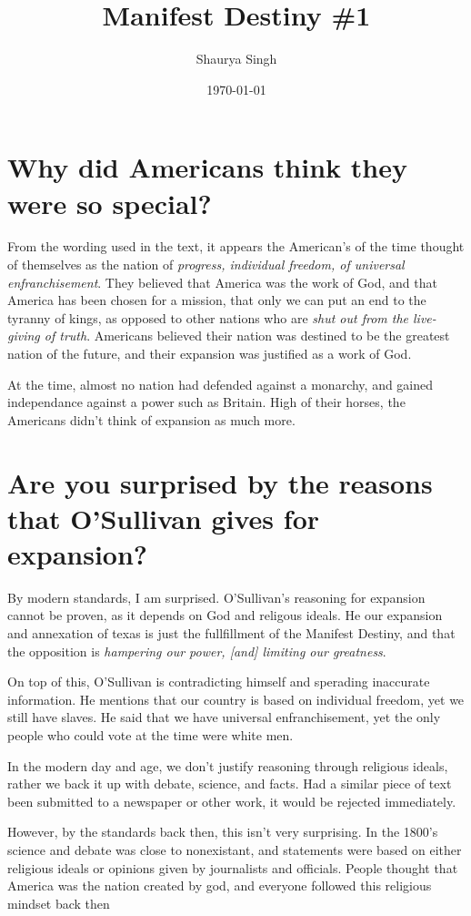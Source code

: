 \documentclass{scrartcl}
\author{Shaurya Singh}
\date{\today}
\title{Manifest Destiny \#1}
\begin{document}
\maketitle

\section{Why did Americans think they were so special?}
\label{sec:org399c913}
From the wording used in the text, it appears the American's of the time thought
of themselves as the nation of \emph{progress, individual freedom, of universal enfranchisement}. They believed that America was the work of God, and that
America has been chosen for a mission, that only we can put an end to the
tyranny of kings, as opposed to other nations who are \emph{shut out from the live-giving of truth}. Americans believed their nation was destined to be the
greatest nation of the future, and their expansion was justified as a work of
God.

At the time, almost no nation had defended against a monarchy, and gained
independance against a power such as Britain. High of their horses, the
Americans didn't think of expansion as much more.

\section{Are you surprised by the reasons that O’Sullivan gives for expansion?}
\label{sec:org0e2a765}
By modern standards, I am surprised. O’Sullivan's reasoning for expansion cannot
be proven, as it depends on God and religous ideals. He our expansion and
annexation of texas is just the fullfillment of the Manifest Destiny, and that
the opposition is \emph{hampering our power, [and] limiting our greatness}.

On top of this, O'Sullivan is contradicting himself and sperading inaccurate
information. He mentions that our country is based on individual freedom, yet we
still have slaves. He said that we have universal enfranchisement, yet the only
people who could vote at the time were white men.

In the modern day and age, we don't justify reasoning through religious ideals,
rather we back it up with debate, science, and facts. Had a similar piece of
text been submitted to a newspaper or other work, it would be rejected
immediately.

However, by the standards back then, this isn't very surprising. In the 1800's
science and debate was close to nonexistant, and statements were based on either
religious ideals or opinions given by journalists and officials. People thought
that America was the nation created by god, and everyone followed this
religious mindset back then
\end{document}
